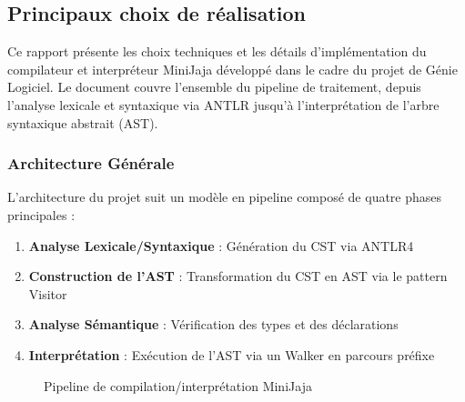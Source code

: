\subsection{Principaux choix de réalisation}

Ce rapport présente les choix techniques et les détails d'implémentation du compilateur et interpréteur MiniJaja développé dans le cadre du projet de Génie Logiciel. Le document couvre l'ensemble du pipeline de traitement, depuis l'analyse lexicale et syntaxique via ANTLR jusqu'à l'interprétation de l'arbre syntaxique abstrait (AST).

\subsubsection{Architecture Générale}

L'architecture du projet suit un modèle en pipeline composé de quatre phases principales :

\begin{enumerate}
    \item \textbf{Analyse Lexicale/Syntaxique} : Génération du CST via ANTLR4
    \item \textbf{Construction de l'AST} : Transformation du CST en AST via le pattern Visitor
    \item \textbf{Analyse Sémantique} : Vérification des types et des déclarations
    \item \textbf{Interprétation} : Exécution de l'AST via un Walker en parcours préfixe
\end{enumerate}

\begin{figure}[h]
\centering
{}
\caption{Pipeline de compilation/interprétation MiniJaja}
\end{figure}


